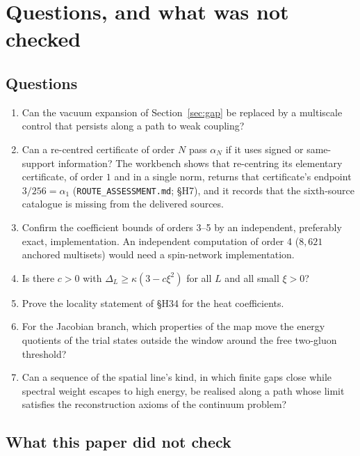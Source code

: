 \section{Questions, and what was not checked}\label{sec:open}

\subsection{Questions}

\begin{enumerate}[label=\arabic*.,ref=\arabic*]
\item\label{q:multiscale} Can the vacuum expansion of Section~\ref{sec:gap} be replaced by a multiscale control that persists along a path to weak coupling?
\item\label{q:recentre} Can a re-centred certificate of order $N$ pass $\alpha_N$ if it uses signed or same-support information? The workbench shows that re-centring its elementary certificate, of order $1$ and in a single norm, returns that certificate's endpoint $3/256=\alpha_1$ (\texttt{ROUTE\_ASSESSMENT.md}; §H7), and it records that the sixth-source catalogue is missing from the delivered sources.
\item\label{q:inputs} Confirm the coefficient bounds of orders 3--5 by an independent, preferably exact, implementation. An independent computation of order 4 ($8{,}621$ anchored multisets) would need a spin-network implementation.
\item\label{q:secondorder} Is there $c>0$ with $\Delta_L\ge\kappa(3-c\xi^2)$ for all $L$ and all small $\xi>0$?
\item\label{q:locality} Prove the locality statement of §H34 for the heat coefficients.
\item\label{q:jacwindow} For the Jacobian branch, which properties of the map move the energy quotients of the trial states outside the window around the free two-gluon threshold?
\item\label{q:axioms} Can a sequence of the spatial line's kind, in which finite gaps close while spectral weight escapes to high energy, be realised along a path whose limit satisfies the reconstruction axioms of the continuum problem?
\end{enumerate}

\subsection{What this paper did not check}


